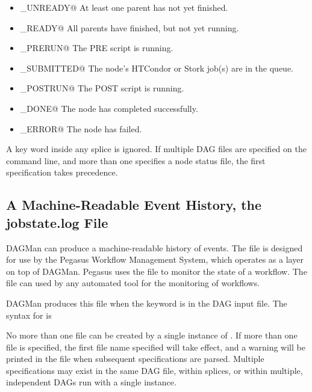 \begin{itemize}
\item \verb@STATUS_UNREADY@ At least one parent has not yet finished.
\item \verb@STATUS_READY@ All parents have finished, but not yet running.
\item \verb@STATUS_PRERUN@ The PRE script is running.
\item \verb@STATUS_SUBMITTED@ The node's HTCondor or Stork job(s) are in 
  the queue.
\item \verb@STATUS_POSTRUN@ The POST script is running.
\item \verb@STATUS_DONE@ The node has completed successfully.
\item \verb@STATUS_ERROR@ The node has failed.
\end{itemize}

A  key word inside any splice is ignored.
If multiple DAG files are specified on the  command line,
and more than one specifies a node status file,
the first specification takes precedence.

\subsection{\label{sec:DAGJobstateLog}A Machine-Readable Event History, the jobstate.log File}

DAGMan can produce a machine-readable history of events.
The  file is designed for use by the Pegasus Workflow
Management System, which operates as a layer on top of DAGMan.  Pegasus
uses the  file to monitor the state of a workflow.
The  file can used by any
automated tool for the monitoring of workflows.

DAGMan produces this file when the keyword  is
in the DAG input file.
The syntax for  is

 

No more than one  file can be created by a single
instance of .
If more than one  file is specified,
the first file name specified will take effect,
and a warning will be printed in the  file
when subsequent  specifications are parsed.
Multiple specifications may exist in the same DAG file, within splices,
or within multiple, independent DAGs run with a single  instance.

